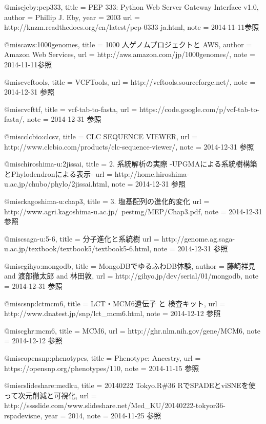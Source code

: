@misc{jeby:pep333,
	title  = {PEP 333: Python Web Server Gateway Interface v1.0},
	author = {Phillip J. Eby},
	year   = {2003}
	url    = {http://knzm.readthedocs.org/en/latest/pep-0333-ja.html},
	note   = {2014-11-11参照}
}

@misc{aws:1000genomes,
	title  = {1000 人ゲノムプロジェクトと AWS},
	author = {Amazon Web Services},
	url    = {http://aws.amazon.com/jp/1000genomes/},
	note   = {2014-11-11参照}
}

@misc{vcftools,
	title = {VCFTools},
	url   = {http://vcftools.sourceforge.net/},
	note  = {2014-12-31 参照}
}

@misc{vcfttf,
	title = {vcf-tab-to-fasta},
	url   = {https://code.google.com/p/vcf-tab-to-fasta/},
	note  = {2014-12-31 参照}
}

@misc{clcbio:clcsv,
	title = {CLC SEQUENCE VIEWER},
	url   = {http://www.clcbio.com/products/clc-sequence-viewer/},
	note  = {2014-12-31 参照}
}

@misc{hiroshima-u:2jissai,
	title = {2. 系統解析の実際 -UPGMAによる系統樹構築とPhylodendronによる表示-}
	url   = {http://home.hiroshima-u.ac.jp/chubo/phylo/2jissai.html},
	note  = {2014-12-31 参照}
}

@misc{kagoshima-u:chap3,
	title = {3. 塩基配列の進化的変化}
	url   = {http://www.agri.kagoshima-u.ac.jp/~pestmg/MEP/Chap3.pdf},
	note  = {2014-12-31 参照}
}

@misc{saga-u:5-6,
	title = {分子進化と系統樹}
	url   = {http://genome.ag.saga-u.ac.jp/textbook/textbook5/textbook5-6.html},
	note  = {2014-12-31 参照}
}

@misc{gihyo:mongodb,
	title = {MongoDBでゆるふわDB体験},
	author = {藤崎祥見 and 渡部徹太郎 and 林田敦},
	url   = {http://gihyo.jp/dev/serial/01/mongodb},
	note  = {2014-12-31 参照}
}

@misc{snp:lctmcm6,
	title = {LCT・MCM6遺伝子 と 検査キット},
	url   = {http://www.dnatest.jp/snp/lct\_mcm6.html},
	note  = {2014-12-12 参照}
}

@misc{ghr:mcm6,
	title = {MCM6},
	url   = {http://ghr.nlm.nih.gov/gene/MCM6},
	note  = {2014-12-12 参照}
}

@misc{opensnp:phenotypes,
	title = {Phenotype: Ancestry},
	url   = {https://opensnp.org/phenotypes/110},
	note  = {2014-11-15 参照}
}

@misc{slideshare:medku,
	title = {20140222 Tokyo.R\#36 RでSPADEとviSNEを使って次元削減と可視化},
	url   = {http://sssslide.com/www.slideshare.net/Med\_KU/20140222-tokyor36-rspadevisne},
	year  = {2014},
	note  = {2014-11-25 参照}
}

